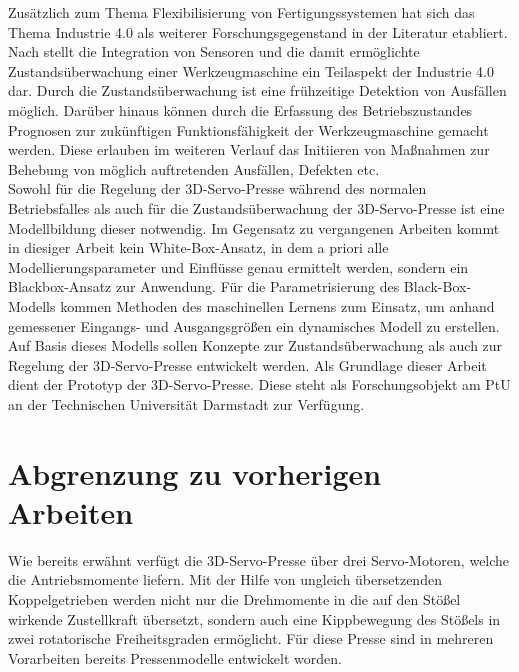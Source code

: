 Zusätzlich zum Thema Flexibilisierung von Fertigungssystemen hat sich das Thema Industrie 4.0 als weiterer Forschungsgegenstand in der Literatur etabliert. Nach \cite{VDMA.2018} stellt die Integration von Sensoren und die damit ermöglichte Zustandsüberwachung einer Werkzeugmaschine ein Teilaspekt der Industrie 4.0 dar. Durch die Zustandsüberwachung ist eine frühzeitige Detektion von Ausfällen möglich. Darüber hinaus können durch die Erfassung des Betriebszustandes Prognosen zur zukünftigen Funktionsfähigkeit der Werkzeugmaschine gemacht werden. Diese erlauben im weiteren Verlauf das Initiieren von Maßnahmen zur Behebung von möglich auftretenden Ausfällen, Defekten etc. \cite{VDMA.2018} \\

Sowohl für die Regelung der 3D-Servo-Presse während des normalen Betriebsfalles als auch für die Zustandsüberwachung der 3D-Servo-Presse ist eine Modellbildung dieser notwendig. Im Gegensatz zu vergangenen Arbeiten kommt in diesiger Arbeit kein White-Box-Ansatz, in dem a priori alle Modellierungsparameter und Einflüsse genau ermittelt werden, sondern ein Blackbox-Ansatz zur Anwendung. Für die Parametrisierung des Black-Box-Modells kommen Methoden des maschinellen Lernens zum Einsatz, um anhand gemessener Eingangs- und Ausgangsgrößen ein dynamisches Modell zu erstellen. Auf Basis dieses Modells sollen Konzepte zur Zustandsüberwachung als auch zur Regelung der 3D-Servo-Presse entwickelt werden. Als Grundlage dieser Arbeit dient der Prototyp der 3D-Servo-Presse. Diese steht als Forschungsobjekt am PtU an der Technischen Universität Darmstadt zur Verfügung. \\

\section{Abgrenzung zu vorherigen Arbeiten}

Wie bereits erwähnt verfügt die 3D-Servo-Presse über drei Servo-Motoren, welche die Antriebsmomente liefern. Mit der Hilfe von ungleich übersetzenden Koppelgetrieben werden nicht nur die Drehmomente in die auf den Stößel wirkende Zustellkraft übersetzt, sondern auch eine Kippbewegung des Stößels in zwei rotatorische Freiheitsgraden ermöglicht. Für diese Presse sind in mehreren Vorarbeiten bereits Pressenmodelle entwickelt worden. \\

